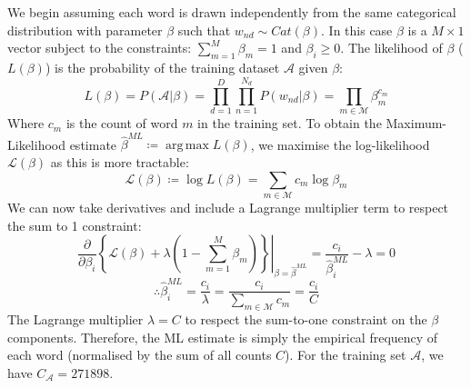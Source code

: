 \documentclass[]{article}
\DeclareMathOperator*{\argmax}{arg\,max}
\newcommand{\Acal}{\mathcal{A}}
\newcommand{\Lcal}{\mathcal{L}}
\newcommand{\Mcal}{\mathcal{M}}
\newcommand{\betaml}{\hat{\beta}^{ML}}
\begin{document}
We begin assuming each word is drawn independently from the same categorical distribution with parameter $\beta$ such that $w_{nd} \sim Cat(\beta)$. In this case $\beta$ is a $M \times 1$ vector subject to the constraints: $\sum_{m=1}^{M} \beta_m = 1$ and $\beta_i \geq 0$. The likelihood of $\beta$ ($L(\beta)$) is the probability of the training dataset $\Acal$ given $\beta$:
%
\begin{equation}
	L(\beta) = P(\Acal | \beta) = \prod_{d=1}^{D} \prod_{n=1}^{N_d} P(w_{nd} | \beta) = \prod_{m \in \Mcal} \beta_m ^{c_m}
\end{equation}
%
Where $c_m$ is the count of word $m$ in the training set. To obtain the Maximum-Likelihood estimate $\betaml \coloneqq \argmax L(\beta)$, we maximise the log-likelihood $\Lcal(\beta)$ as this is more tractable:
%
\begin{equation}
	\Lcal(\beta) \coloneqq \log L(\beta) = \sum_{m \in \Mcal} c_m \log \beta_m
\end{equation}
%
We can now take derivatives and include a Lagrange multiplier term to respect the sum to 1 constraint:
%
\begin{equation*}
	\frac{\partial}{\partial \beta_i}  \left. \left\{ \Lcal(\beta) + \lambda \left(1 - \sum_{m=1}^{M} \beta_m \right) \right\} \right|_{\beta = \betaml} = \frac{c_i}{\betaml_i} - \lambda= 0
\end{equation*}
\begin{equation}
	\therefore \betaml_i = \frac{c_i}{\lambda} = \frac{c_i}{\sum_{m \in \Mcal} c_m} = \frac{c_i}{C}
\end{equation}
%
The Lagrange multiplier $\lambda = C$ to respect the sum-to-one constraint on the $\beta$ components. Therefore, the ML estimate is simply the empirical frequency of each word (normalised by the sum of all counts $C$). For the training set $\Acal$, we have $C_\Acal = 271898$.
%
\end{document}
